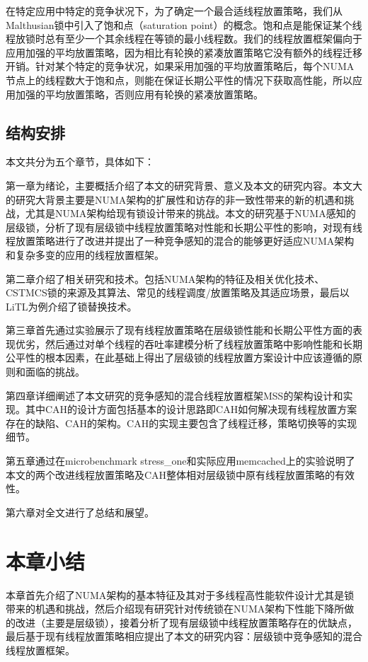 在特定应用中特定的竞争状况下，为了确定一个最合适线程放置策略，我们从Malthusian锁中引入了饱和点（saturation point）的概念。饱和点是能保证某个线程放锁时总有至少一个其余线程在等锁的最小线程数。我们的线程放置框架偏向于应用加强的平均放置策略，因为相比有轮换的紧凑放置策略它没有额外的线程迁移开销。针对某个特定的竞争状况，如果采用加强的平均放置策略后，每个NUMA节点上的线程数大于饱和点，则能在保证长期公平性的情况下获取高性能，所以应用加强的平均放置策略，否则应用有轮换的紧凑放置策略。
\subsection{结构安排}
本文共分为五个章节，具体如下：

第一章为绪论，主要概括介绍了本文的研究背景、意义及本文的研究内容。本文大的研究大背景主要是NUMA架构的扩展性和访存的非一致性带来的新的机遇和挑战，尤其是NUMA架构给现有锁设计带来的挑战。本文的研究基于NUMA感知的层级锁，分析了现有层级锁中线程放置策略对性能和长期公平性的影响，对现有线程放置策略进行了改进并提出了一种竞争感知的混合的能够更好适应NUMA架构和复杂多变的应用的线程放置框架。

第二章介绍了相关研究和技术。包括NUMA架构的特征及相关优化技术、CSTMCS锁的来源及其算法、常见的线程调度/放置策略及其适应场景，最后以LiTL为例介绍了锁替换技术。

第三章首先通过实验展示了现有线程放置策略在层级锁性能和长期公平性方面的表现优劣，然后通过对单个线程的吞吐率建模分析了线程放置策略中影响性能和长期公平性的根本因素，在此基础上得出了层级锁的线程放置方案设计中应该遵循的原则和面临的挑战。

第四章详细阐述了本文研究的竞争感知的混合线程放置框架MSS的架构设计和实现。其中CAH的设计方面包括基本的设计思路即CAH如何解决现有线程放置方案存在的缺陷、CAH的架构。CAH的实现主要包含了线程迁移，策略切换等的实现细节。

第五章通过在microbenchmark stress\_one和实际应用memcached上的实验说明了本文的两个改进线程放置策略及CAH整体相对层级锁中原有线程放置策略的有效性。

第六章对全文进行了总结和展望。
\section{本章小结}
本章首先介绍了NUMA架构的基本特征及其对于多线程高性能软件设计尤其是锁带来的机遇和挑战，然后介绍现有研究针对传统锁在NUMA架构下性能下降所做的改进（主要是层级锁），接着分析了现有层级锁中线程放置策略存在的优缺点，最后基于现有线程放置策略相应提出了本文的研究内容：层级锁中竞争感知的混合线程放置框架。